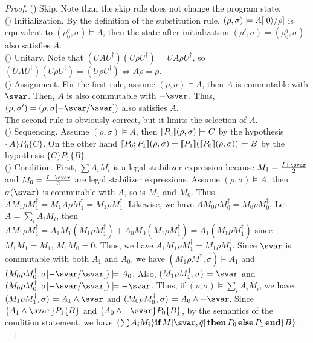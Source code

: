 \soundness*
\begin{proof}
\setcounter{cnt}{0}
(\showcnt) Skip. Note than the skip rule does not change the program state.\\
(\showcnt) Initialization.
By the definition of the substitution rule, $(\rho, \sigma) \models A[\vert 0 \rangle/\rho]$ is equivalent to $(\rho_0^q, \sigma) \models A$, then the state after initialization $(\rho',\sigma) = (\rho_0^q,\sigma)$ also satisfies $A$. \\
(\showcnt) Unitary. Note that $(UAU^\dagger)(U\rho U^\dagger) = U A \rho U^\dagger$, so  \\$(UAU^\dagger)(U\rho U^\dagger) = (U\rho U^\dagger) \Leftrightarrow A\rho = \rho$.
\\
(\showcnt) Assignment. For the first rule, assume $(\rho, \sigma) \models A$, then $A$ is commutable with $\svar$. Then, $A$ is also commutable with $-\svar$. Thus, $(\rho,\sigma') = (\rho,\sigma[-\svar/\svar])$ also satisfies $A$. \\
The second rule is obviously correct, but it limits the selection of $A$. \\
(\showcnt) Sequencing. Assume $(\rho, \sigma) \models A$, then $[\![ P_0 ]\!](\rho, \sigma)\models C$ by the hypothesis $\{A\}P_0\{C\}$. On the other hand $[\![ P_0;P_1 ]\!](\rho,\sigma) = [\![ P_1 ]\!]([\![ P_0 ]\!](\rho, \sigma)) \models B$ by the hypothesis $\{C\}P_1\{B\}$.
\\
(\showcnt) Condition. 
First, $\sum A_i M_i$ is a legal stabilizer expression because $M_1 = \frac{I+\svar}{2}$ and $M_0 = \frac{I-\svar}{2}$ are legal stabilizer expressions. 
Assume $(\rho, \sigma) \models A$, then $\sigma(\svar)$ is commutable with $A$, so is $M_1$ and $M_0$. Thus, $A M_1\rho M_1^\dagger = M_1 A\rho M_1^\dagger = M_1\rho M_1^\dagger$. Likewise, we have $A M_0\rho M_0^\dagger = M_0\rho M_0^\dagger$. Let $A = \sum_i A_i M_i$, then $A M_1\rho M_1^\dagger = A_1M_1(M_1\rho M_1^\dagger) + A_0M_0(M_1\rho M_1^\dagger) = A_1(M_1\rho M_1^\dagger)$ since $M_1M_1 = M_1$, $M_1M_0 = 0$. Thus, we have $A_1M_1\rho M_1^\dagger = M_1\rho M_1^\dagger$. 
Since $\svar$ is commutable with both $A_1$ and $A_0$, we have $(M_1\rho M_1^\dagger,\sigma) \models A_1$ and $(M_0\rho M_0^\dagger,\sigma[-\svar/\svar]) \models A_0$. Also, $(M_1\rho M_1^\dagger,\sigma) \models \svar$ and $(M_0\rho M_0^\dagger,\sigma[-\svar/\svar]) \models -\svar$. Thus, if $(\rho,\sigma)\models \sum_i A_iM_i$, we have $(M_1\rho M_1^\dagger,\sigma) \models A_1\wedge \svar$ and $(M_0\rho M_0^\dagger,\sigma) \models A_0\wedge -\svar$.
Since $\{A_1 \wedge \svar\}P_1\{B\}$ and $\{A_0 \wedge -\svar\}P_0\{B\}$, by the semantics of the condition statement, we have $\{\sum A_i M_i\}\textbf{if}\,M[\svar, \bar{q}]\,\textbf{then}\, P_0\,\textbf{else}\, P_1\,\textbf{end}\{B\}$. \\

\end{proof}
